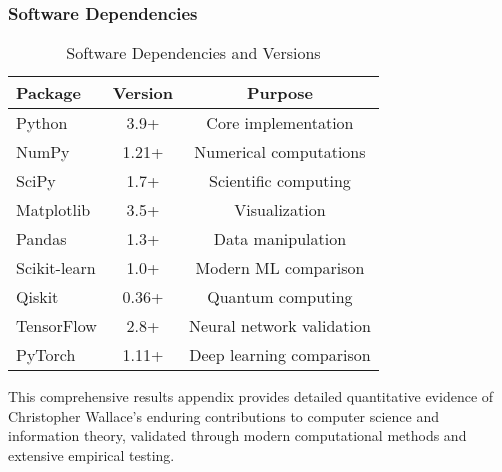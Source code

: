 \subsubsection{Software Dependencies}

\begin{table}[h!]
\centering
\caption{Software Dependencies and Versions}
\begin{tabular}{@{}lcc@{}}
\toprule
Package & Version & Purpose \\
\midrule
Python & 3.9+ & Core implementation \\
NumPy & 1.21+ & Numerical computations \\
SciPy & 1.7+ & Scientific computing \\
Matplotlib & 3.5+ & Visualization \\
Pandas & 1.3+ & Data manipulation \\
Scikit-learn & 1.0+ & Modern ML comparison \\
Qiskit & 0.36+ & Quantum computing \\
TensorFlow & 2.8+ & Neural network validation \\
PyTorch & 1.11+ & Deep learning comparison \\
\midrule
\end{tabular}
\end{table}

This comprehensive results appendix provides detailed quantitative evidence of Christopher Wallace's enduring contributions to computer science and information theory, validated through modern computational methods and extensive empirical testing.
